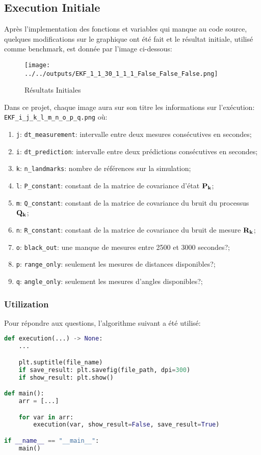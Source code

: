 \documentclass[../CSC_5RO12_TA_TP2.tex]{subfiles}
\begin{document}
\subsection{Execution Initiale}
\noindent Après l'implementation des fonctions et variables qui manque au code source, quelques modifications sur le graphique ont été fait et le résultat initiale, utilisé comme benchmark, est donnée par l'image ci-dessous:
\begin{figure}[H]
    \centering
	\texttt{[image: ../../outputs/EKF\_1\_1\_30\_1\_1\_1\_False\_False\_False.png]}
	\caption{Résultats Initiales}
	\label{}
\end{figure}
\begin{remark}
    Dans ce projet, chaque image aura sur son titre les informations sur l'exécution: \texttt{EKF\_i\_j\_k\_l\_m\_n\_o\_p\_q.png} où:
    \begin{enumerate}[noitemsep]
        \item \texttt{j}: \texttt{dt\_measurement}: intervalle entre deux mesures consécutives en secondes;
        \item \texttt{i}: \texttt{dt\_prediction}: intervalle entre deux prédictions consécutives en secondes;
        \item \texttt{k}: \texttt{n\_landmarks}: nombre de références sur la simulation;
        \item \texttt{l}: \texttt{P\_constant}: constant de la matrice de covariance d'état $\bf{P}_{k}$;
        \item \texttt{m}: \texttt{Q\_constant}: constant de la matrice de covariance du bruit du processus $\bf{Q}_{k}$;
        \item \texttt{n}: \texttt{R\_constant}: constant de la matrice de covariance du bruit de mesure $\bf{R}_{k}$;
        \item \texttt{o}: \texttt{black\_out}: une manque de mesures entre 2500 et 3000 secondes?;
        \item \texttt{p}: \texttt{range\_only}: seulement les mesures de distances disponibles?;
        \item \texttt{q}: \texttt{angle\_only}: seulement les mesures d'angles disponibles?;
    \end{enumerate}
\end{remark}

\subsubsection{Utilization}
\noindent Pour répondre aux questions, l'algorithme suivant a été utilisé:
\begin{scriptsize}\mycode
	\begin{lstlisting}[language=Python]
def execution(...) -> None:
    ...

    plt.suptitle(file_name)
    if save_result: plt.savefig(file_path, dpi=300)
    if show_result: plt.show()

def main():
    arr = [...]

    for var in arr:
        execution(var, show_result=False, save_result=True)

if __name__ == "__main__":
    main()
	\end{lstlisting}
\end{scriptsize}
\end{document}
